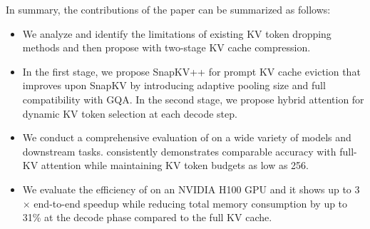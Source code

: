  In summary, the contributions of the paper can be summarized as follows:
 \begin{itemize}
     \item We analyze and identify the limitations of existing KV token dropping methods and then propose \rocketkv with two-stage KV cache compression.
     \item In the first stage, we propose SnapKV++ for prompt KV cache eviction that improves upon SnapKV by introducing adaptive pooling size and full compatibility with GQA. In the second stage, we propose hybrid attention for dynamic KV token selection at each decode step.
     \item We conduct a comprehensive evaluation of \rocketkv on a wide variety of models and downstream tasks. \rocketkv consistently demonstrates comparable accuracy with full-KV attention while maintaining KV token budgets as low as 256.  
     \item We evaluate the efficiency of \rocketkv on an NVIDIA H100 GPU and it shows up to 3$\times$ end-to-end speedup while reducing total memory consumption by up to 31\% at the decode phase compared to the full KV cache.
 \end{itemize}



 


 